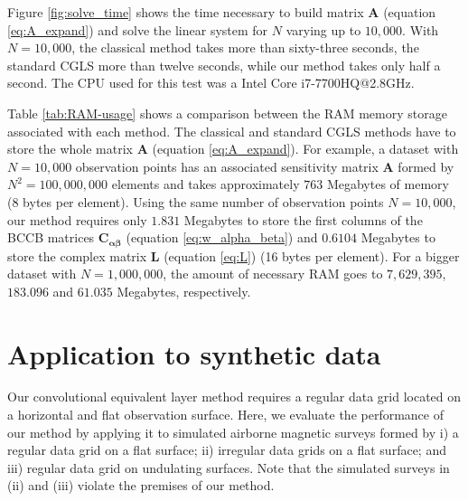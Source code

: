 \documentclass[manuscript]{geophysics}
\begin{document}
	Figure \ref{fig:solve_time} shows the time necessary to build matrix $\mathbf{A}$ 
	(equation \ref{eq:A_expand}) and solve the linear system for $N$ varying up to $10,000$. 
	With $N = 10,000$, the classical method takes more than sixty-three seconds, the standard 
	CGLS more than twelve seconds, while our method takes only half a second. 
	The CPU used for this test was a Intel Core i7-7700HQ@2.8GHz.
	
	
	Table \ref{tab:RAM-usage} shows a comparison between the RAM memory storage 
	associated with each method. The classical and standard CGLS methods have to store the whole 
	matrix $\mathbf{A}$ (equation \ref{eq:A_expand}). For example, a dataset with 
	$N = 10,000$ observation points has an associated sensitivity matrix $\mathbf{A}$ formed by 
	$N^2 = 100,000,000$ elements and takes approximately $763$ Megabytes of memory (8 bytes per element). 
	Using the same number of observation points $N = 10,000$, our method requires only 
	$1.831$ Megabytes to store the first columns of the BCCB matrices
	$\mathbf{C}_{\boldsymbol{\alpha\beta}}$ (equation \ref{eq:w_alpha_beta}) and 
	$0.6104$ Megabytes to store the complex matrix $\mathbf{L}$ (equation \ref{eq:L}) 
	(16 bytes per element). For a bigger dataset with $N = 1,000,000$, the amount of necessary RAM 
	goes to $7,629,395$, $183.096$ and $61.035$ Megabytes, respectively.
	
	\section{Application to synthetic data}
	
	Our convolutional equivalent layer method requires a regular data grid located on a 
	horizontal and flat observation surface.
	Here, we evaluate the performance of our method by applying it to simulated airborne magnetic 
	surveys formed by
	i) a regular data grid on a flat surface;
	ii) irregular data grids on a flat surface; and 
	iii) regular data grid on undulating surfaces.
	Note that the simulated surveys in (ii) and (iii) violate the premises of our method. 
	
\end{document}
